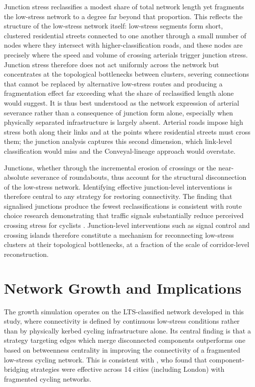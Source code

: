 Junction stress reclassifies a modest share of total network length yet fragments the low-stress network to a degree far beyond that proportion. This reflects the structure of the low-stress network itself: low-stress segments form short, clustered residential streets connected to one another through a small number of nodes where they intersect with higher-classification roads, and these nodes are precisely where the speed and volume of crossing arterials trigger junction stress. Junction stress therefore does not act uniformly across the network but concentrates at the topological bottlenecks between clusters, severing connections that cannot be replaced by alternative low-stress routes and producing a fragmentation effect far exceeding what the share of reclassified length alone would suggest. It is thus best understood as the network expression of arterial severance rather than a consequence of junction form alone, especially when physically separated infrastructure is largely absent. Arterial roads impose high stress both along their links and at the points where residential streets must cross them; the junction analysis captures this second dimension, which link-level classification would miss and the Conveyal-lineage approach would overstate.

Junctions, whether through the incremental erosion of crossings or the near-absolute severance of roundabouts, thus account for the structural disconnection of the low-stress network. Identifying effective junction-level interventions is therefore central to any strategy for restoring connectivity. The finding that signalised junctions produce the fewest reclassifications is consistent with route choice research demonstrating that traffic signals substantially reduce perceived crossing stress for cyclists \parencite{broach2012}. Junction-level interventions such as signal control and crossing islands therefore constitute a mechanism for reconnecting low-stress clusters at their topological bottlenecks, at a fraction of the scale of corridor-level reconstruction.

\section{Network Growth and Implications}
\label{sec:disc-planning}

The growth simulation operates on the LTS-classified network developed in this study, where connectivity is defined by continuous low-stress conditions rather than by physically kerbed cycling infrastructure alone. Its central finding is that a strategy targeting edges which merge disconnected components outperforms one based on betweenness centrality in improving the connectivity of a fragmented low-stress cycling network. This is consistent with \textcite{nateraorozco2020}, who found that component-bridging strategies were effective across 14 cities (including London) with fragmented cycling networks.

